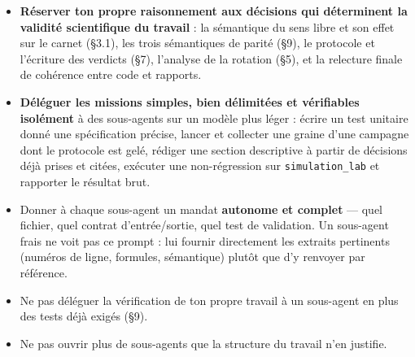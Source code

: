\documentclass[11pt,a4paper]{article}
\newcommand{\code}[1]{\texttt{#1}}
\begin{document}
\begin{itemize}
\item \textbf{Réserver ton propre raisonnement aux décisions qui déterminent la validité scientifique du travail} : la sémantique du sens libre et son effet sur le carnet (§3.1), les trois sémantiques de parité (§9), le protocole et l'écriture des verdicts (§7), l'analyse de la rotation (§5), et la relecture finale de cohérence entre code et rapports.
\item \textbf{Déléguer les missions simples, bien délimitées et vérifiables isolément} à des sous-agents sur un modèle plus léger : écrire un test unitaire donné une spécification précise, lancer et collecter une graine d'une campagne dont le protocole est gelé, rédiger une section descriptive à partir de décisions déjà prises et citées, exécuter une non-régression sur \code{simulation\_lab} et rapporter le résultat brut.
\item Donner à chaque sous-agent un mandat \textbf{autonome et complet} --- quel fichier, quel contrat d'entrée/sortie, quel test de validation. Un sous-agent frais ne voit pas ce prompt : lui fournir directement les extraits pertinents (numéros de ligne, formules, sémantique) plutôt que d'y renvoyer par référence.
\item Ne pas déléguer la vérification de ton propre travail à un sous-agent en plus des tests déjà exigés (§9).
\item Ne pas ouvrir plus de sous-agents que la structure du travail n'en justifie.
\end{itemize}
\end{document}
